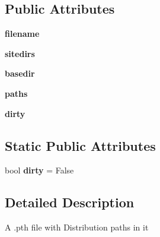 \subsection*{Public Attributes}
\begin{DoxyCompactItemize}
\item 
\mbox{\label{classsetuptools_1_1command_1_1easy__install_1_1_pth_distributions_ad28df9eb65540b9f423ed563a51eec10}} 
{\bfseries filename}
\item 
\mbox{\label{classsetuptools_1_1command_1_1easy__install_1_1_pth_distributions_a23bbbd0c5ba2b4108d346559451b5788}} 
{\bfseries sitedirs}
\item 
\mbox{\label{classsetuptools_1_1command_1_1easy__install_1_1_pth_distributions_a4ae0b9878f4e790842de737042c8e276}} 
{\bfseries basedir}
\item 
\mbox{\label{classsetuptools_1_1command_1_1easy__install_1_1_pth_distributions_aaeff84e1e64e746b8f64c993a7b23c4d}} 
{\bfseries paths}
\item 
\mbox{\label{classsetuptools_1_1command_1_1easy__install_1_1_pth_distributions_ace5478320ad351592e00e5682b9c8ae2}} 
{\bfseries dirty}
\end{DoxyCompactItemize}
\subsection*{Static Public Attributes}
\begin{DoxyCompactItemize}
\item 
\mbox{\label{classsetuptools_1_1command_1_1easy__install_1_1_pth_distributions_a9d4d591dc4f6e5fd37aa0ad55ce9da9a}} 
bool {\bfseries dirty} = False
\end{DoxyCompactItemize}


\subsection{Detailed Description}
\begin{DoxyVerb}A .pth file with Distribution paths in it\end{DoxyVerb}
 

